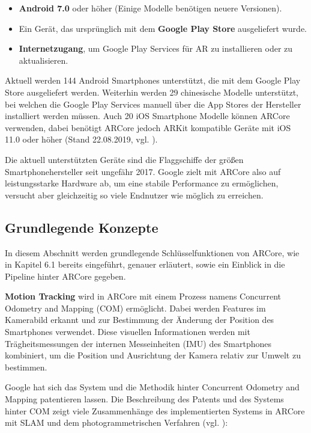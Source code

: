 \begin{itemize}
\item \textbf{Android 7.0} oder höher (Einige Modelle benötigen neuere Versionen).
\item Ein Gerät, das ursprünglich mit dem \textbf{Google Play Store} ausgeliefert wurde.
\item \textbf{Internetzugang}, um Google Play Services für AR zu installieren oder zu aktualisieren.
\end{itemize}

Aktuell werden 144 Android Smartphones unterstützt, die mit dem Google Play Store ausgeliefert werden. Weiterhin werden 29 chinesische Modelle unterstützt, bei welchen die Google Play Services manuell über die App Stores der Hersteller installiert werden müssen. Auch 20 iOS Smartphone Modelle können ARCore verwenden, dabei benötigt ARCore jedoch ARKit kompatible Geräte mit iOS 11.0 oder höher (Stand 22.08.2019, vgl. \cite{arcore_devices}).

Die aktuell unterstützten Geräte sind die Flaggschiffe der größen Smartphonehersteller seit ungefähr 2017. Google zielt mit ARCore also auf leistungsstarke Hardware ab, um eine stabile Performance zu ermöglichen, versucht aber gleichzeitig so viele Endnutzer wie möglich zu erreichen.

\subsection{Grundlegende Konzepte}

In diesem Abschnitt werden grundlegende Schlüsselfunktionen von ARCore, wie in Kapitel 6.1 bereits eingeführt, genauer erläutert, sowie ein Einblick in die Pipeline hinter ARCore gegeben.

\textbf{Motion Tracking} wird in ARCore mit einem Prozess namens \glqq Concurrent Odometry and Mapping\grqq{} (COM) ermöglicht. Dabei werden Features im Kamerabild erkannt und zur Bestimmung der Änderung der Position des Smartphones verwendet. Diese visuellen Informationen werden mit Trägheitsmessungen der internen Messeinheiten (IMU) des Smartphones kombiniert, um die Position und Ausrichtung der Kamera relativ zur Umwelt zu bestimmen.

Google hat sich das System und die Methodik hinter \glqq Concurrent Odometry and Mapping\grqq{} patentieren lassen. Die Beschreibung des Patents und des Systems hinter COM zeigt viele Zusammenhänge des implementierten Systems in ARCore mit SLAM und dem photogrammetrischen Verfahren (vgl. \cite{patent}): 

